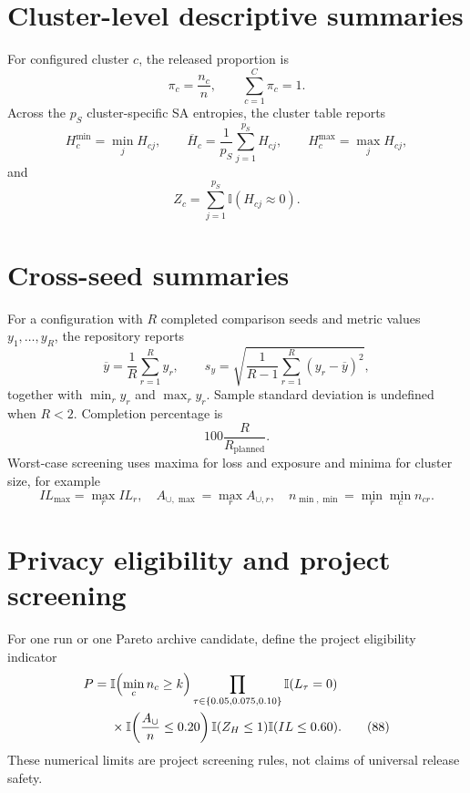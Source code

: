\documentclass[11pt,a4paper]{article}
\newcommand{\I}{\mathbb{I}}
\begin{document}
\section{Cluster-level descriptive summaries}

For configured cluster $c$, the released proportion is
\begin{equation}
\pi_c=\frac{n_c}{n},
\qquad \sum_{c=1}^{C}\pi_c=1.
\tag{82}
\end{equation}
Across the $p_S$ cluster-specific SA entropies, the cluster table reports
\begin{equation}
H_c^{\min}=\min_j H_{cj},\qquad
\overline H_c=\frac1{p_S}\sum_{j=1}^{p_S}H_{cj},\qquad
H_c^{\max}=\max_j H_{cj},
\tag{83}
\end{equation}
and
\begin{equation}
Z_c=\sum_{j=1}^{p_S}\I(H_{cj}\approx0).
\tag{84}
\end{equation}

\section{Cross-seed summaries}

For a configuration with $R$ completed comparison seeds and metric values
$y_1,\ldots,y_R$, the repository reports
\begin{equation}
\overline y=\frac1R\sum_{r=1}^{R}y_r,
\qquad
s_y=\sqrt{\frac1{R-1}\sum_{r=1}^{R}(y_r-\overline y)^2},
\tag{85}
\end{equation}
together with $\min_r y_r$ and $\max_r y_r$.  Sample standard deviation is
undefined when $R<2$.  Completion percentage is
\begin{equation}
100\frac{R}{R_{\mathrm{planned}}}.
\tag{86}
\end{equation}
Worst-case screening uses maxima for loss and exposure and minima for cluster
size, for example
\begin{equation}
IL_{\max}=\max_r IL_r,
\quad
A_{\cup,\max}=\max_r A_{\cup,r},
\quad
n_{\min,\min}=\min_r\min_c n_{cr}.
\tag{87}
\end{equation}

\section{Privacy eligibility and project screening}

For one run or one Pareto archive candidate, define the project eligibility
indicator
\begin{align}
P={}&\I\!\left(\min_c n_c\ge k\right)
\prod_{\tau\in\{0.05,0.075,0.10\}}\I(L_\tau=0)\notag\\
&\times\I\!\left(\frac{A_{\cup}}n\le0.20\right)
\I(Z_H\le1)\I(IL\le0.60).
\tag{88}
\end{align}
These numerical limits are project screening rules, not claims of universal
release safety.
\end{document}
